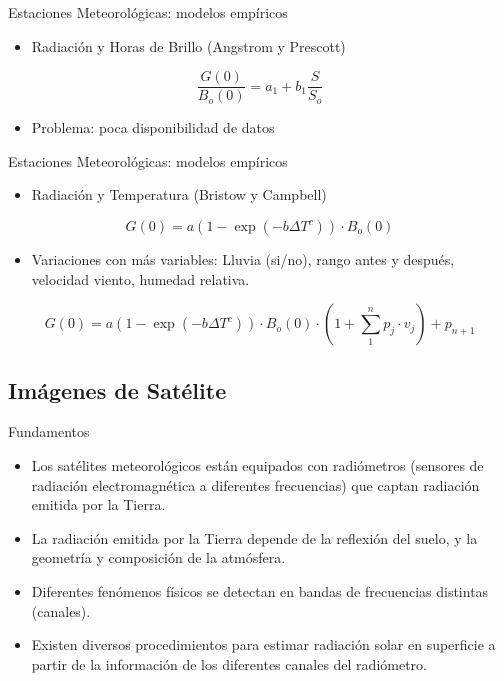 \documentclass[xcolor={usenames,svgnames,dvipsnames}]{beamer}
\begin{document}
\begin{frame}[label={sec:orgbe2f9b3}]{Estaciones Meteorológicas: modelos empíricos}
\begin{itemize}
\item Radiación y Horas de Brillo (Angstrom y Prescott)
\end{itemize}

\[
\frac{G(0)}{B_o(0)} = a_1 + b_1 \frac{S}{S_o}
\]

\begin{itemize}
\item Problema: poca disponibilidad de datos
\end{itemize}
\end{frame}

\begin{frame}[label={sec:orga9182e5}]{Estaciones Meteorológicas: modelos empíricos}
\begin{itemize}
\item Radiación y Temperatura (Bristow y Campbell)
\end{itemize}
\[
G(0) = a \left(1 - \exp(-b \Delta T^c)\right) \cdot B_o(0)
\]

\begin{itemize}
\item Variaciones con más variables: Lluvia (si/no), rango antes y después, velocidad viento, humedad relativa.
\end{itemize}

\[
  G(0) = a \left(1 - \exp(-b \Delta T^c)\right) \cdot B_o(0) \cdot \left(1 +
    \sum_1^n p_j \cdot v_j \right) + p_{n+1}
\]

\nocite{Antonanzas-Torres.Sanz-Garcia.ea2013}
\end{frame}

\subsection{Imágenes de Satélite}
\label{sec:org5d6762a}

\begin{frame}[label={sec:org3d47462}]{Fundamentos}
\begin{itemize}
\item Los satélites meteorológicos están equipados con \alert{radiómetros}
(sensores de radiación electromagnética a diferentes frecuencias)
que captan \alert{radiación emitida por la Tierra}.

\item La radiación emitida por la Tierra depende de la \alert{reflexión del
suelo}, y la \alert{geometría y composición de la atmósfera}.

\item Diferentes fenómenos físicos se detectan en \alert{bandas de frecuencias}
distintas (canales).

\item Existen diversos procedimientos para \alert{estimar radiación solar} en
superficie a partir de la información de los diferentes canales del
radiómetro.
\end{itemize}
\end{frame}
\end{document}
